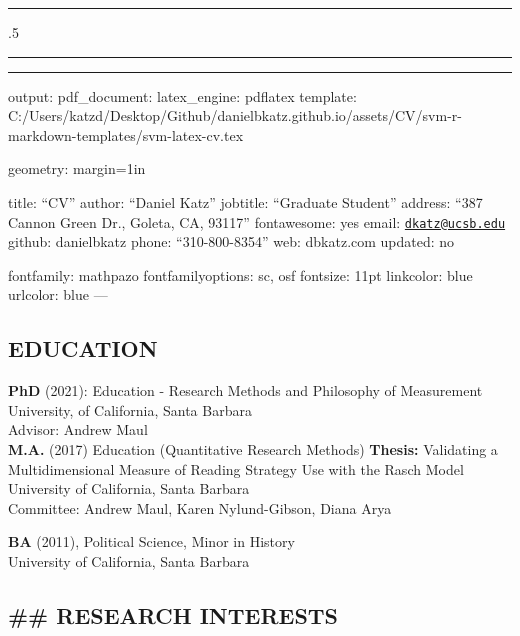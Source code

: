 \documentclass[]{article}
\begin{document}
\centerline{\huge \bf }

\vspace{2 mm}

\hrule

\vspace{2 mm}



\moveleft.5\hoffset\centerline{        }

\vspace{2 mm}

\hrule


\begin{center}\rule{0.5\linewidth}{\linethickness}\end{center}

output: pdf\_document: latex\_engine: pdflatex template:
C:/Users/katzd/Desktop/Github/danielbkatz.github.io/assets/CV/svm-r-markdown-templates/svm-latex-cv.tex

geometry: margin=1in

title: ``CV'' author: ``Daniel Katz'' jobtitle: ``Graduate Student''
address: ``387 Cannon Green Dr., Goleta, CA, 93117'' fontawesome: yes
email: \href{mailto:dkatz@ucsb.edu}{\nolinkurl{dkatz@ucsb.edu}} github:
danielbkatz phone: ``310-800-8354'' web: dbkatz.com updated: no

fontfamily: mathpazo fontfamilyoptions: sc, osf fontsize: 11pt
linkcolor: blue urlcolor: blue ---

\hypertarget{education}{%
\subsection{EDUCATION}\label{education}}

\textbf{PhD} (2021): Education - Research Methods and Philosophy of
Measurement\\
University, of California, Santa Barbara\\
Advisor: Andrew Maul\\
\textbf{M.A.} (2017) Education (Quantitative Research Methods)
\textbf{Thesis:} Validating a Multidimensional Measure of Reading
Strategy Use with the Rasch Model University of California, Santa
Barbara\\
Committee: Andrew Maul, Karen Nylund-Gibson, Diana Arya

\textbf{BA} (2011), Political Science, Minor in History\\
University of California, Santa Barbara

\hypertarget{research-interests}{%
\subsection{\#\# RESEARCH INTERESTS}\label{research-interests}}
\end{document}
